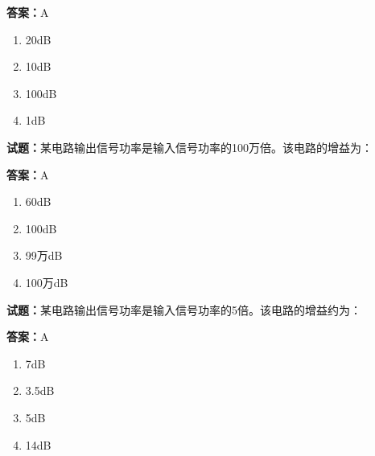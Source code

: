 \documentclass{ctexbook}
\begin{document}
\textbf{答案：}A 

\begin{enumerate}[leftmargin=3em]
  \item 20dB 

  \item 10dB 

  \item 100dB 

  \item 1dB 

\end{enumerate}






\vspace{1em}

\textbf{试题：}某电路输出信号功率是输入信号功率的100万倍。该电路的增益为： 

\textbf{答案：}A 

\begin{enumerate}[leftmargin=3em]
  \item 60dB 

  \item 100dB 

  \item 99万dB 

  \item 100万dB 

\end{enumerate}





\vspace{1em}

\textbf{试题：}某电路输出信号功率是输入信号功率的5倍。该电路的增益约为： 

\textbf{答案：}A 

\begin{enumerate}[leftmargin=3em]
  \item 7dB 

  \item 3.5dB 

  \item 5dB 

  \item 14dB 

\end{enumerate}
\end{document}
